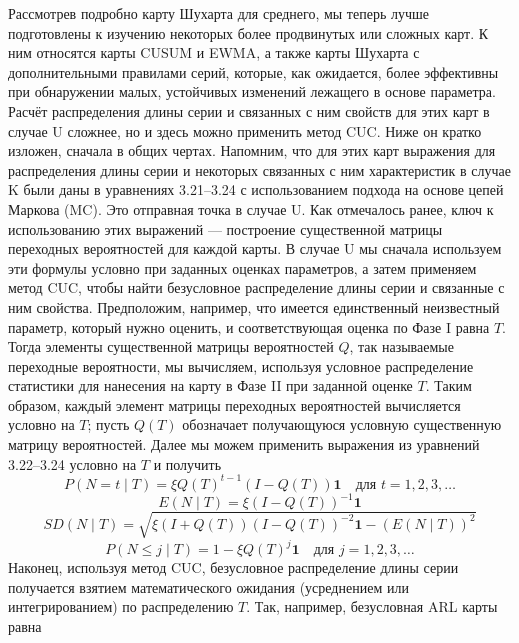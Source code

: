 Рассмотрев подробно карту Шухарта для среднего, мы теперь лучше подготовлены к изучению некоторых более продвинутых или сложных карт. К ним относятся карты CUSUM и EWMA, а также карты Шухарта с дополнительными правилами серий, которые, как ожидается, более эффективны при обнаружении малых, устойчивых изменений лежащего в основе параметра. Расчёт распределения длины серии и связанных с ним свойств для этих карт в случае U сложнее, но и здесь можно применить метод CUC. Ниже он кратко изложен, сначала в общих чертах. Напомним, что для этих карт выражения для распределения длины серии и некоторых связанных с ним характеристик в случае K были даны в уравнениях 3.21–3.24 с использованием подхода на основе цепей Маркова (MC). Это отправная точка в случае U. Как отмечалось ранее, ключ к использованию этих выражений — построение существенной матрицы переходных вероятностей для каждой карты. В случае U мы сначала используем эти формулы условно при заданных оценках параметров, а затем применяем метод CUC, чтобы найти безусловное распределение длины серии и связанные с ним свойства. Предположим, например, что имеется единственный неизвестный параметр, который нужно оценить, и соответствующая оценка по Фазе I равна \(T\). Тогда элементы существенной матрицы вероятностей \(Q\), так называемые переходные вероятности, мы вычисляем, используя условное распределение статистики для нанесения на карту в Фазе II при заданной оценке \(T\). Таким образом, каждый элемент матрицы переходных вероятностей вычисляется условно на \(T\); пусть \(Q(T)\) обозначает получающуюся условную существенную матрицу вероятностей. Далее мы можем применить выражения из уравнений 3.22–3.24 условно на \(T\) и получить
\begin{equation}
	P(N = t \mid T) = \xi Q(T)^{t-1}(I - Q(T))\mathbf{1}
	\quad\text{для } t = 1, 2, 3, \ldots
	\label{eq:3.36}
\end{equation}
\begin{equation}
	E(N \mid T) = \xi (I - Q(T))^{-1}\mathbf{1}
	\label{eq:3.37}
\end{equation}
\begin{equation}
	SD(N \mid T) = \sqrt{\xi (I + Q(T))(I - Q(T))^{-2}\mathbf{1} - (E(N \mid T))^2}
	\label{eq:3.38}
\end{equation}
\begin{equation}
	P(N \le j \mid T) = 1 - \xi Q(T)^j \mathbf{1}
	\quad\text{для } j = 1, 2, 3, \ldots
	\label{eq:3.39}
\end{equation}
Наконец, используя метод CUC, безусловное распределение длины серии получается взятием математического ожидания (усреднением или интегрированием) по распределению \(T\). Так, например, безусловная ARL карты равна
